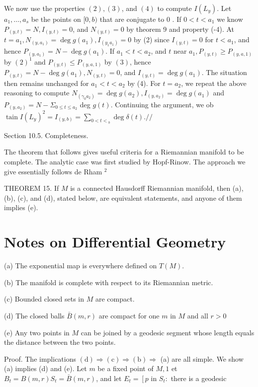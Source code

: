 \documentclass[10pt]{article}
\begin{document}
We now use the properties $(2),(3)$, and $(4)$ to compute $I\left(L_{y}\right)$. Let $a_{1}, \ldots, a_{s}$ be the points on $[0, b)$ that are conjugate to 0 . If $0<t<a_{1}$ we know $P_{(y, t)}=N, I_{(y, t)}=0$, and $N_{(y, t)}=0$ by theorem 9 and property (-4). At $t=a_{1}, N_{\left(y, a_{1}\right)}=\operatorname{deg} g\left(a_{1}\right), I_{\left(y_{1} a_{1}\right)}=0$ by (2) since $I_{(y, t)}=0$ for $t<a_{1}$, and hence $P_{\left(y, a_{1}\right)}=N-\operatorname{deg} g\left(a_{1}\right)$. If $a_{1}<t<a_{2}$, and $t$ near $a_{1}, P_{(y, t)} \geq P_{(y, a, 1)}$ by $(2)^{1}$ and $P_{(y, t)} \leq P_{(y, a, 1)}$ by $(3)$, hence $P_{(y, t)}=N-\operatorname{deg} g\left(a_{1}\right), N_{(y, t)}=0$, and $I_{(y, t)}=\operatorname{deg} g\left(a_{1}\right)$. The situation then remains unchanged for $a_{1}<t<a_{2}$ by (4). For $t=a_{2}$, we repeat the above reasoning to compute $N_{\left(\gamma_{0} a_{2}\right)}=\operatorname{deg} g\left(a_{2}\right), I_{\left(y, a_{2}\right)}=\operatorname{deg} g\left(a_{1}\right)$ and $P_{\left(y, a_{2}\right)}=N-\Sigma_{0 \leq t \leq a_{2}}$ deg $g(t)$. Continuing the argument, we ob$\operatorname{tain} I\left(L_{y}\right)^{2}=I_{(y, b)}=\sum_{0<t<{ }_{b}} \operatorname{deg} \delta(t) . / /$

Section 10.5. Completeness.

The theorem that follows gives useful criteria for a Riemannian manifold to be complete. The analytic case was first studied by Hopf-Rinow. The approach we give essentially follows de Rham ${ }^{2}$

THEOREM 15. If $M$ is a connected Hausdorff Riemannian manifold, then (a), (b), (c), and (d), stated below, are equivalent statements, and anyone of them implies (e).

\section{Notes on Differential Geometry}
(a) The exponential map is everywhere defined on $T(M)$.

(b) The manifold is complete with respect to its Riemannian metric.

(c) Bounded closed sets in $M$ are compact.

(d) The closed balls $\bar{B}(m, r)$ are compact for one $m$ in $M$ and all $r>0$

(e) Any two points in $M$ can be joined by a geodesic segment whose length equals the distance between the two points.

Proof. The implications $(\mathrm{d}) \Rightarrow(\mathrm{c}) \Rightarrow(\mathrm{b}) \Rightarrow$ (a) are all simple. We show (a) implies (d) and (e). Let $m$ be a fixed point of $M, 1$ et $B_{t}=B(m, r) S_{t}=\bar{B}(m, r)$, and let $E_{t}=\left[p\right.$ in $S_{t}:$ there is a geodesic
\end{document}

